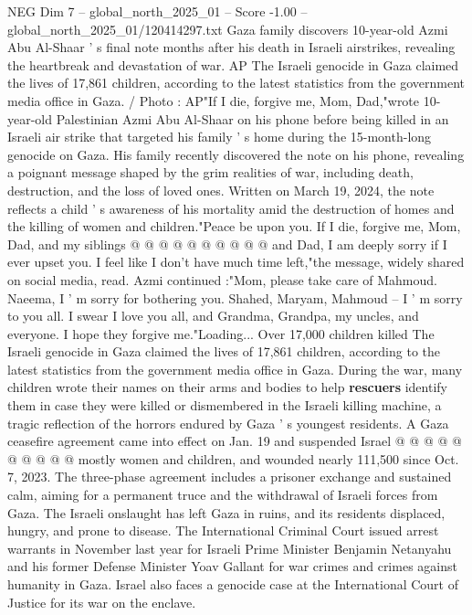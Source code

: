 \begin{textsample}{NEG Dim 7 – global\_north\_2025\_01 – Score -1.00 – global\_north\_2025\_01/120414297.txt}  \label{ex:f7_neg_183}
Gaza family discovers 10-year-old Azmi Abu Al-Shaar ' s final note months after his death in Israeli airstrikes, revealing the heartbreak and devastation of war.
AP The Israeli genocide in Gaza claimed the lives of 17,861 children, according to the latest statistics from the government media office in Gaza. / Photo : AP"If I die, forgive me, Mom, Dad,"wrote 10-year-old Palestinian Azmi Abu Al-Shaar on his phone before being killed in an Israeli air strike that targeted his family ' s home during the 15-month-long genocide on Gaza.
His family recently discovered the note on his phone, revealing a poignant message shaped by the grim realities of war, including death, destruction, and the loss of loved ones.
Written on March 19, 2024, the note reflects a child ' s awareness of his mortality amid the destruction of homes and the killing of women and children."Peace be upon you.
If I die, forgive me, Mom, Dad, and my siblings @ @ @ @ @ @ @ @ @ @ and Dad, I am deeply sorry if I ever upset you.
I feel like I don't have much time left,"the message, widely shared on social media, read.
Azmi continued :"Mom, please take care of Mahmoud.
Naeema, I ' m sorry for bothering you.
Shahed, Maryam, Mahmoud -- I ' m sorry to you all.
I swear I love you all, and Grandma, Grandpa, my uncles, and everyone.
I hope they forgive me."Loading...
Over 17,000 children killed The Israeli genocide in Gaza claimed the lives of 17,861 children, according to the latest statistics from the government media office in Gaza.
During the war, many children wrote their names on their arms and bodies to help \textbf{rescuers} identify them in case they were killed or dismembered in the Israeli killing machine, a tragic reflection of the horrors endured by Gaza ' s youngest residents.
A Gaza ceasefire agreement came into effect on Jan. 19 and suspended Israel @ @ @ @ @ @ @ @ @ @ mostly women and children, and wounded nearly 111,500 since Oct. 7, 2023.
The three-phase agreement includes a prisoner exchange and sustained calm, aiming for a permanent truce and the withdrawal of Israeli forces from Gaza.
The Israeli onslaught has left Gaza in ruins, and its residents displaced, hungry, and prone to disease.
The International Criminal Court issued arrest warrants in November last year for Israeli Prime Minister Benjamin Netanyahu and his former Defense Minister Yoav Gallant for war crimes and crimes against humanity in Gaza.
Israel also faces a genocide case at the International Court of Justice for its war on the enclave.

\end{textsample}
